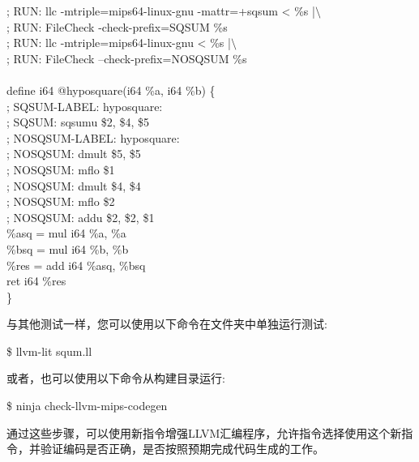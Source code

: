 \begin{tcolorbox}[colback=white,colframe=black]
; RUN: llc -mtriple=mips64-linux-gnu -mattr=+sqsum < \%s |$\setminus$ \\
; RUN: FileCheck -check-prefix=SQSUM \%s \\
; RUN: llc -mtriple=mips64-linux-gnu < \%s |$\setminus$ \\
; RUN: FileCheck --check-prefix=NOSQSUM \%s \\
\\
define i64 @hyposquare(i64 \%a, i64 \%b) \{ \\
; SQSUM-LABEL: hyposquare: \\
; SQSUM: sqsumu \$2, \$4, \$5 \\
; NOSQSUM-LABEL: hyposquare: \\
; NOSQSUM: dmult \$5, \$5 \\
; NOSQSUM: mflo \$1 \\
; NOSQSUM: dmult \$4, \$4 \\
; NOSQSUM: mflo \$2 \\
; NOSQSUM: addu \$2, \$2, \$1 \\
\hspace*{0.5cm}\%asq = mul i64 \%a, \%a \\
\hspace*{0.5cm}\%bsq = mul i64 \%b, \%b \\
\hspace*{0.5cm}\%res = add i64 \%asq, \%bsq \\
\hspace*{0.5cm}ret i64 \%res \\
\}
\end{tcolorbox}

与其他测试一样，您可以使用以下命令在文件夹中单独运行测试:\par

\begin{tcolorbox}[colback=white,colframe=black]
\$ llvm-lit squm.ll
\end{tcolorbox}

或者，也可以使用以下命令从构建目录运行:

\begin{tcolorbox}[colback=white,colframe=black]
	\$  ninja check-llvm-mips-codegen
\end{tcolorbox}

通过这些步骤，可以使用新指令增强LLVM汇编程序，允许指令选择使用这个新指令，并验证编码是否正确，是否按照预期完成代码生成的工作。\par

































